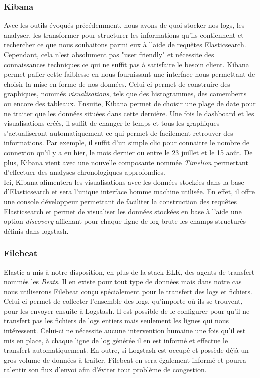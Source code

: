 	\subsubsection{Kibana}
	Avec les outils évoqués précédemment, nous avons de quoi stocker nos logs, les analyser, les transformer pour structurer les informations qu'ils contiennent et rechercher ce que nous souhaitons parmi eux à l'aide de requêtes Elasticsearch. Cependant, cela n'est absolument pas "user friendly" et nécessite des connaissances techniques ce qui ne suffit pas à satisfaire le besoin client. Kibana permet palier cette faiblesse en nous fournissant une interface nous permettant de choisir la mise en forme de nos données. Celui-ci permet de construire des graphiques, nommés \textit{visualisations}, tels que des histogrammes, des camemberts ou encore des tableaux. Ensuite, Kibana permet de choisir une plage de date pour ne traiter que les données situées dans cette dernière. Une fois le dashboard et les visualisations créés, il suffit de changer le temps et tous les graphiques s'actualiseront automatiquement ce qui permet de facilement retrouver des informations. Par exemple, il suffit d'un simple clic pour connaitre le nombre de connexion qu'il y a eu hier, le mois dernier ou entre le 23 juillet et le 15 août. De plus, Kibana vient avec une nouvelle composante nommée \textit{Timelion} permettant d'effectuer des analyses chronologiques approfondies. \\
	
	Ici, Kibana alimentera les visualisations avec les données stockées dans la base d'Elasticsearch et sera l'unique interface homme machine utilisée. En effet, il offre une console développeur permettant de faciliter la construction des requêtes Elasticsearch et permet de visualiser les données stockées en base à l'aide une option \textit{discovery} affichant pour chaque ligne de log brute les champs structurés définis dans logstash.
	
	\subsubsection{Filebeat}	
	Elastic a mis à notre disposition, en plus de la stack ELK, des agents de transfert nommés les \textit{Beats}. Il en existe pour tout type de données mais dans notre cas nous utiliserons Filebeat conçu spécialement pour le transfert des logs et fichiers. Celui-ci permet de collecter l'ensemble des logs, qu'importe où ils se trouvent, pour les envoyer ensuite à Logstash. Il est possible de le configurer pour qu'il ne transfert pas les fichiers de logs entiers mais seulement les lignes qui nous intéressent. Celui-ci ne nécessite aucune intervention humaine une fois qu'il est mis en place, à chaque ligne de log générée il en est informé et effectue le transfert automatiquement. En outre, si Logstash est occupé et possède déjà un gros volume de données à traiter, Filebeat en sera également informé et pourra ralentir son flux d'envoi afin d'éviter tout problème de congestion.

